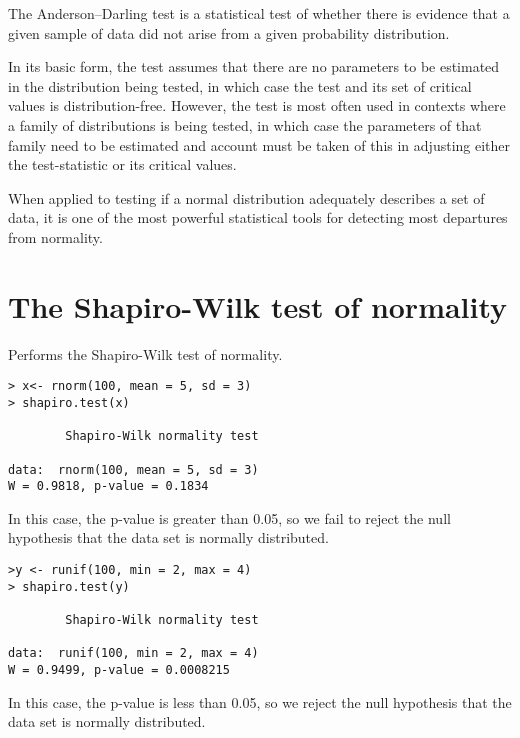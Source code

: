 \documentclass[a4paper,12pt]{article}
\begin{document}
The Anderson–Darling test is a statistical test of whether there is evidence that a given sample of data did not arise from a given probability distribution.

In its basic form, the test assumes that there are no parameters to be estimated in the distribution being tested, in which case the test and its set of critical values is distribution-free. However, the test is most often used in contexts where a family of distributions is being tested, in which case the parameters of that family need to be estimated and account must be taken of this in adjusting either the test-statistic or its critical values.

When applied to testing if a normal distribution adequately describes a set of data, it is one of the most powerful statistical tools for detecting most departures from normality.

\section{The Shapiro-Wilk test of normality}
Performs the Shapiro-Wilk test of normality.
\begin{framed}
\begin{verbatim}
> x<- rnorm(100, mean = 5, sd = 3)
> shapiro.test(x)

        Shapiro-Wilk normality test

data:  rnorm(100, mean = 5, sd = 3)
W = 0.9818, p-value = 0.1834
\end{verbatim}
\end{framed}
In this case, the p-value is greater than 0.05, so we fail to reject the null hypothesis that the
data set is normally distributed.
\begin{framed}
\begin{verbatim}
>y <- runif(100, min = 2, max = 4)
> shapiro.test(y)

        Shapiro-Wilk normality test

data:  runif(100, min = 2, max = 4)
W = 0.9499, p-value = 0.0008215
\end{verbatim}
\end{framed}
In this case, the p-value is less than 0.05, so we reject the null hypothesis that the
data set is normally distributed.
\end{document}
